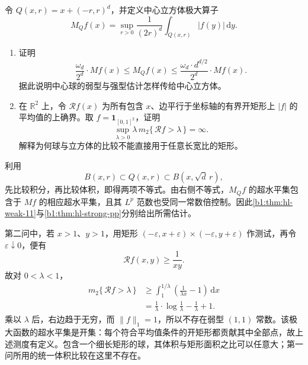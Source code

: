 \begin{exercise}\label{b1:ex:13-cubes-rectangles}
令 \(Q(x,r)=x+(-r,r)^d\)，并定义中心立方体极大算子
\[
 M_Q f(x)=\sup_{r>0}\frac1{(2r)^d}\int_{Q(x,r)}|f(y)|\,\mathrm dy.
\]
\begin{enumerate}
\item\label{b1:item:13-cube-comparison}
证明
\[
 \frac{\omega_d}{2^d}\cdot Mf(x)\le M_Q f(x)
 \le\frac{\omega_d\cdot d^{d/2}}{2^d}\cdot Mf(x).
\]
据此说明中心球的弱型与强型估计怎样传给中心立方体。
\item\label{b1:item:13-rectangle-failure}
在 \(\mathbb R^2\) 上，令 \(\mathcal Rf(x)\) 为所有包含 \(x\)、边平行于坐标轴的有界开矩形上 \(|f|\) 的平均值的上确界。取 \(f=\mathbf1_{[0,1]^2}\)，证明
\[
 \sup_{\lambda>0}\lambda\,m_2\{\,\mathcal Rf>\lambda\,\}=\infty.
\]
解释为何球与立方体的比较不能直接用于任意长宽比的矩形。
\end{enumerate}
\end{exercise}
\begin{solution}
利用
\[
 B(x,r)\subset Q(x,r)\subset B(x,\sqrt d\,r),
\]
先比较积分，再比较体积，即得两项不等式。由右侧不等式，\(M_Q f\) 的超水平集包含于 \(Mf\) 的相应超水平集，且其 \(L^p\) 范数也受同一常数倍控制。因此\cref{b1:thm:hl-weak-11}与\cref{b1:thm:hl-strong-pp}分别给出所需估计。

第二问中，若 \(x>1\)、\(y>1\)，用矩形 \((-\varepsilon,x+\varepsilon)\times(-\varepsilon,y+\varepsilon)\) 作测试，再令 \(\varepsilon\downarrow0\)，便有
\[
 \mathcal Rf(x,y)\ge\frac1{xy}.
\]
故对 \(0<\lambda<1\)，
\begin{align*}
 m_2\{\,\mathcal Rf>\lambda\,\}
 &\ge\int_1^{1/\lambda}\left(\frac1{\lambda x}-1\right)\,\mathrm dx\\
 &=\frac1\lambda\cdot \log\frac1\lambda-\frac1\lambda+1.
\end{align*}
乘以 \(\lambda\) 后，右边趋于无穷，而 \(\|f\|_1=1\)，所以不存在弱型 \((1,1)\) 常数。该极大函数的超水平集是开集：每个符合平均值条件的开矩形都贡献其中全部点，故上述测度有定义。包含一个细长矩形的球，其体积与矩形面积之比可以任意大；第一问所用的统一体积比较在这里不存在。
\end{solution}

